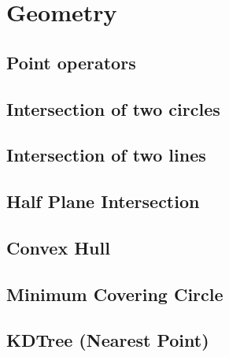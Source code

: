\documentclass[10pt,twocolumn,oneside]{article}
\begin{document}
\section{Geometry}
\subsection{Point operators}


\subsection{Intersection of two circles}



\subsection{Intersection of two lines}


\subsection{Half Plane Intersection}


%

\subsection{Convex Hull}


\subsection{Minimum Covering Circle}


\subsection{KDTree (Nearest Point)}

\end{document}
